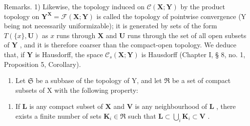 Remarks. 1) Likewise, the topology induced on \(\mathcal{C}(\mathbf{X};\mathbf{Y})\) by the product topology on \(\mathbf{Y}^{\mathbf{X}} = \mathcal{F}(\mathbf{X};\mathbf{Y})\) is called the topology of pointwise convergence (Y being not necessarily uniformizable); it is generated by sets of the form \(T(\{x\}, \mathbf{U})\) as \(x\) runs through \(\mathbf{X}\) and \(\mathbf{U}\) runs through the set of all open subsets of \(\mathbf{Y}\) , and it is therefore coarser than the compact-open topology. We deduce that, if \(\mathbf{Y}\) is Hausdorff, the space \(\mathcal{C}_s(\mathbf{X}; \mathbf{Y})\) is Hausdorff (Chapter I, § 8, no. 1, Proposition 5, Corollary).

\begin{enumerate}
\def\labelenumi{\arabic{enumi})}
\setcounter{enumi}{1}
\tightlist
\item
  Let \(\mathfrak{S}\) be a subbase of the topology of Y, and let \(\mathfrak{R}\) be a set of compact subsets of X with the following property:
\end{enumerate}

\begin{enumerate}
\def\labelenumi{(\Alph{enumi})}
\setcounter{enumi}{17}
\tightlist
\item
  If \(\mathbf{L}\) is any compact subset of \(\mathbf{X}\) and \(\mathbf{V}\) is any neighbourhood of \(\mathbf{L}\) , there exists a finite number of sets \(\mathbf{K}_i \in \mathfrak{R}\) such that \(\mathbf{L} \subset \bigcup_{i} \mathbf{K}_i \subset \mathbf{V}\) .
\end{enumerate}

